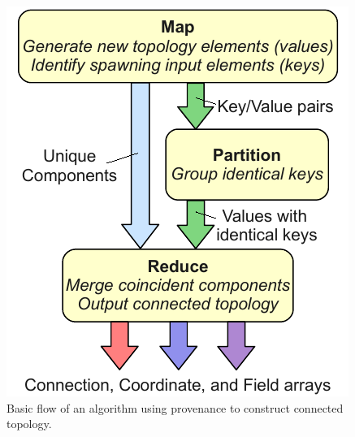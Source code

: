 \documentclass[10pt,journal,cspaper,compsoc]{IEEEtran}
\begin{document}
\begin{figure}[htb]
  \includegraphics[width=\linewidth]{MapPartitionReduce.pdf}
  \caption{Basic flow of an algorithm using provenance to construct
    connected topology.}
  \label{fig:ProvenanceFlow}
\end{figure}
\end{document}
